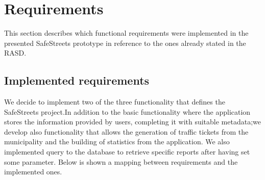 \documentclass[../ITD.tex]{subfiles}
\begin{document}
    \chapter{Requirements}\label{ch:requirements}
    This section describes which functional requirements were implemented in the presented SafeStreets prototype in reference to the ones already stated in the RASD.
    \section{Implemented requirements}\label{sec:implemented-requirements}
    We decide to implement two of the three functionality that defines the SafeStreets project.In addition to the basic functionality where the application stores the information provided by users, completing it with suitable metadata;we develop also functionality that allows the generation of traffic tickets from the municipality and the building of statistics from the application.
    We also implemented query to the database to retrieve specific reports after having set some parameter.
    \newline Below is shown a mapping between requirements and the implemented ones.
\end{document}
